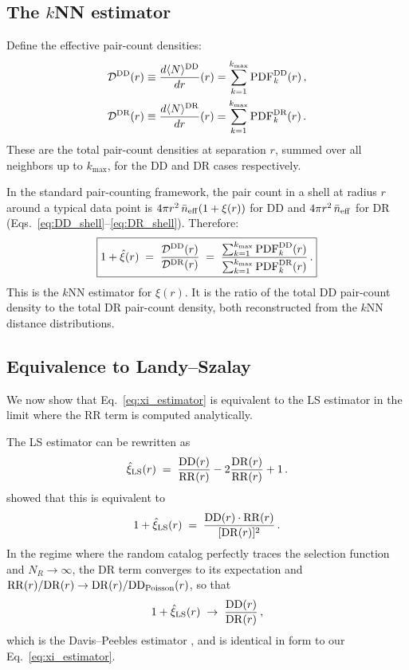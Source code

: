 \subsection{The $k$NN estimator}
\label{sec:knn_estimator}

Define the effective pair-count densities:
\begin{align}
  \mathcal{D}^{\mathrm{DD}}(r) &\equiv \frac{d\langle N\rangle^{\mathrm{DD}}}{dr}(r) = \sum_{k=1}^{k_{\max}} \mathrm{PDF}^{\mathrm{DD}}_k(r)\,,\label{eq:D_DD}\\
  \mathcal{D}^{\mathrm{DR}}(r) &\equiv \frac{d\langle N\rangle^{\mathrm{DR}}}{dr}(r) = \sum_{k=1}^{k_{\max}} \mathrm{PDF}^{\mathrm{DR}}_k(r)\,.\label{eq:D_DR}
\end{align}
These are the total pair-count densities at separation $r$, summed over all neighbors up to $k_{\max}$, for the DD and DR cases respectively.

In the standard pair-counting framework, the pair count in a shell at radius $r$ around a typical data point is $4\pi r^2\,\bar{n}_{\rm eff}(1 + \xi(r))$ for DD and $4\pi r^2\,\bar{n}_{\rm eff}$ for DR (Eqs.~\ref{eq:DD_shell}--\ref{eq:DR_shell}).  Therefore:
\begin{equation}
  \boxed{1 + \hat{\xi}(r) \;=\; \frac{\mathcal{D}^{\mathrm{DD}}(r)}{\mathcal{D}^{\mathrm{DR}}(r)} \;=\; \frac{\sum_{k=1}^{k_{\max}} \mathrm{PDF}^{\mathrm{DD}}_k(r)}{\sum_{k=1}^{k_{\max}} \mathrm{PDF}^{\mathrm{DR}}_k(r)}\,.}
  \label{eq:xi_estimator}
\end{equation}
This is the $k$NN estimator for $\xi(r)$.  It is the ratio of the total DD pair-count density to the total DR pair-count density, both reconstructed from the $k$NN distance distributions.

\subsection{Equivalence to Landy--Szalay}
\label{sec:equivalence}

We now show that Eq.~\eqref{eq:xi_estimator} is equivalent to the LS estimator in the limit where the RR term is computed analytically.

The LS estimator can be rewritten as
\begin{equation}
  \hat{\xi}_{\mathrm{LS}}(r) \;=\; \frac{\mathrm{DD}(r)}{\mathrm{RR}(r)} - 2\frac{\mathrm{DR}(r)}{\mathrm{RR}(r)} + 1\,.
  \label{eq:LS_rewrite}
\end{equation}
\citet{Hamilton1993} showed that this is equivalent to
\begin{equation}
  1 + \hat{\xi}_{\mathrm{LS}}(r) \;=\; \frac{\mathrm{DD}(r)\cdot\mathrm{RR}(r)}{[\mathrm{DR}(r)]^2}\,.
  \label{eq:Hamilton}
\end{equation}
In the regime where the random catalog perfectly traces the selection function and $N_R \to \infty$, the DR term converges to its expectation and $\mathrm{RR}(r) / \mathrm{DR}(r) \to \mathrm{DR}(r) / \mathrm{DD}_{\rm Poisson}(r)$, so that
\begin{equation}
  1 + \hat{\xi}_{\mathrm{LS}}(r) \;\to\; \frac{\mathrm{DD}(r)}{\mathrm{DR}(r)}\,,
  \label{eq:LS_ratio}
\end{equation}
which is the Davis--Peebles estimator \citep{DavisHuchra1982}, and is identical in form to our Eq.~\eqref{eq:xi_estimator}.

